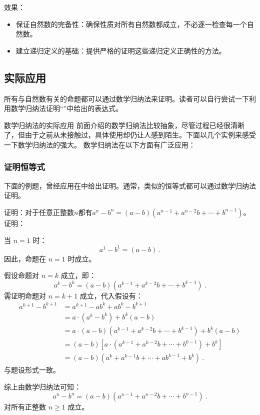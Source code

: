 效果：
\begin{itemize}
\item 保证自然数的完备性：确保性质对所有自然数都成立，不必逐一检查每一个自然数。
\item 建立递归定义的基础：提供严格的证明这些递归定义正确性的方法。
\end{itemize}
\subsection{实际应用}


所有与自然数有关的命题都可以通过数学归纳法来证明。读者可以自行尝试一下利用数学归纳法证明“”中给出的表达式。

数学归纳法的实际应用
前面介绍的数学归纳法比较抽象，尽管过程已经很清晰了，但由于之前从未接触过，具体使用却仍让人感到陌生。下面以几个实例来感受一下数学归纳法的强大。
数学归纳法在以下方面有广泛应用：

\subsubsection{证明恒等式}
下面的例题，曾经应用在中给出证明。通常，类似的恒等式都可以通过数学归纳法证明。
\begin{example}{证明：对于任意正整数$n$都有$a^n-b^n=\left(a-b\right)\left(a^{n-1}+a^{n-2}b+\cdots+b^{n-1}\right)$。}
证明：

当 $n = 1$ 时：
\begin{equation}
a^1 - b^1 = (a - b)~.
\end{equation}
因此，命题在 $n = 1$ 时成立。

假设命题对 $n = k$ 成立，即：
\begin{equation}
a^k - b^k = (a - b)\left(a^{k-1} + a^{k-2}b + \cdots + b^{k-1}\right)~.
\end{equation}
需证明命题对 $n = k+1$ 成立，代入假设有：
\begin{equation}
\begin{aligned}
a^{k+1} - b^{k+1} &= a^{k+1}-ab^k+ab^k - b^{k+1}\\
&= a \cdot (a^k - b^k) + b^k(a - b)\\
&=a \cdot (a - b)\left(a^{k-1} + a^{k-2}b + \cdots + b^{k-1}\right) + b^k(a - b)\\
&=(a - b)\left[a \cdot \left(a^{k-1} + a^{k-2}b + \cdots + b^{k-1}\right) + b^k\right]\\
&=(a - b)\left(a^{k} + a^{k-1}b + \cdots + ab^{k-1} + b^k\right)~.
\end{aligned}
\end{equation}
与题设形式一致。

综上由数学归纳法可知：
\begin{equation}
a^n - b^n = (a - b)\left(a^{n-1} + a^{n-2}b + \cdots + b^{n-1}\right)~.
\end{equation}
对所有正整数 $n \geq 1$ 成立。
\end{example}

